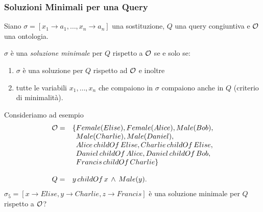 \documentclass[8pt]{beamer}
\begin{document}
\begin{frame}
\frametitle{Soluzioni Minimali per una Query}
Siano $\sigma=[x_1 \rightarrow a_1, \ldots, x_n \rightarrow a_n]$ 
una sostituzione, $Q$ una query congiuntiva e $\mathcal{O}$ una ontologia.
\vspace{\baselineskip}

$\sigma$ \`e una \emph{soluzione minimale} per $Q$ rispetto a $\mathcal{O}$
se e solo se:
\begin{enumerate}
 \item $\sigma$ \`e una soluzione per $Q$ rispetto ad $\mathcal{O}$ e inoltre
 \item tutte le variabili $x_1, \ldots, x_n$ che compaiono in $\sigma$
 compaiono anche in $Q$ (criterio di minimalit\`a).
\end{enumerate}
Consideriamo ad esempio
\[
\begin{array}{cl}
  \Ont  =  &  \{Female(Elise), Female(Alice), Male(Bob), \\
  &\phantom{\{}Male(Charlie), Male(Daniel), \\
  &\phantom{\{}Alice\,childOf\,Elise, Charlie\,childOf\,Elise, \\
  &\phantom{\{}Daniel\,childOf\,Alice, Daniel\,childOf\,Bob, \\
  &\phantom{\{}Francis\,childOf\,Charlie \}\\
  &\\
  Q = & y\,childOf\,x\,\wedge\,Male(y) .
 \end{array}
\]
$\sigma_5=[x \rightarrow Elise, y \rightarrow Charlie, z \rightarrow Francis]$ \`e una 
soluzione minimale per $Q$ rispetto a $\mathcal{O}$? 
\vspace{\baselineskip}

\end{frame}
\end{document}
